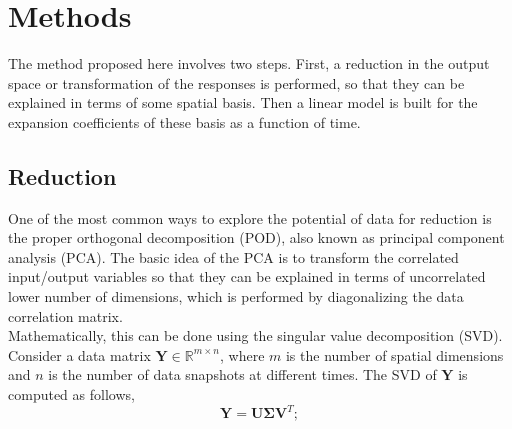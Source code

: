 \documentclass{anstrans}
\begin{document}
\section{Methods}
The method proposed here involves two steps. First, a reduction in the output space or transformation of the responses is performed, so that they can be explained in terms of some spatial basis.
Then a linear model is built for the expansion coefficients of these basis as a function of time. 
\subsection{Reduction}
One of the most common ways to explore the potential of data for reduction is the proper orthogonal decomposition (POD), also known as principal component analysis (PCA).
The basic idea of the PCA is to transform the correlated input/output variables so that they can be explained in terms of uncorrelated lower number of dimensions, which is performed by diagonalizing the data correlation matrix.\\
Mathematically, this can be done using the singular value decomposition (SVD). Consider a data matrix $\textbf{Y} \in \mathbb{R}^{m\times n}$,  where $m$ is the number of spatial dimensions and $n$ is the number of data snapshots at different times. The SVD of $\textbf{Y}$ is computed as follows, 
\begin{equation}
 \textbf{Y} =\textbf{U}\boldsymbol{\Sigma}\textbf{V}^T;
\end{equation}
\end{document}
